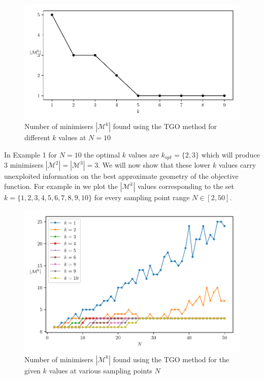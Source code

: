 \begin{figure}
\centerline{\includegraphics[scale=1.0]{./Fig2.pdf}}
{\caption{Number of minimisers $|\mathcal{M}^k|$ found using the TGO method for different $k$ values at $N = 10$}  \label{fig:min}}
\end{figure}

In Example 1 for $N = 10$ the optimal $k$ values are $k_{opt}=\{2, 3\}$ which will produce 3 minimisers $|\mathcal{M}^2| = |\mathcal{M}^3| = 3$. We will now show that these lower $k$ values carry unexploited information on the best approximate geometry of the objective function. For example in  we plot the $|\mathcal{M}^k|$ values corresponding to the set $k = \{1, 2, 3, 4, 5, 6, 7, 8, 9, 10\}$ for every sampling point range $N \in [2, 50]$.

\begin{figure} 
\centerline{\includegraphics[scale=1.0]{./Fig3.pdf}}
{\caption{Number of minimisers $|\mathcal{M}^k|$ found using the TGO method for the given $k$ values at various sampling points $N$} \label{fig:mink}}
\end{figure}

